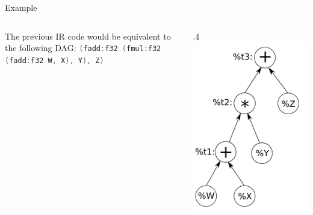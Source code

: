 \documentclass[]{beamer}
\begin{document}
\begin{frame}[fragile]{Example}

\begin{columns}[T]
  \begin{column}{.6\textwidth}
    The previous IR code would be equivalent to the following DAG:
    \lstinline[language=c++]{(fadd:f32 (fmul:f32 (fadd:f32 W, X), Y), Z)}
  \end{column}
  \begin{column}{.4\textwidth}
    \includegraphics[width=.9\textwidth]{pictures/dag_mul_add}
  \end{column}
\end{columns}

\end{frame}
\end{document}
